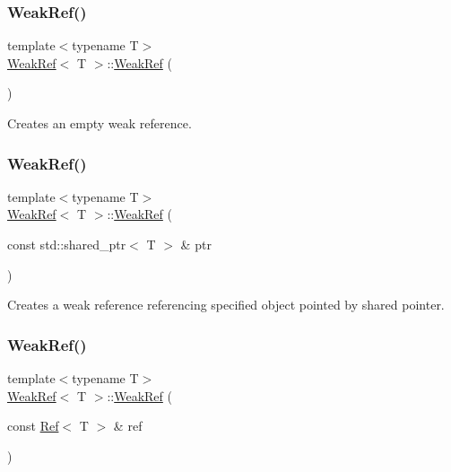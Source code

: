 \subsubsection{\texorpdfstring{WeakRef()}{WeakRef()}\hspace{0.1cm}{\footnotesize\ttfamily [1/4]}}
{\footnotesize\ttfamily template$<$typename T$>$ \\
\mbox{\hyperlink{class_weak_ref}{Weak\+Ref}}$<$ T $>$\+::\mbox{\hyperlink{class_weak_ref}{Weak\+Ref}} (\begin{DoxyParamCaption}{ }\end{DoxyParamCaption})\hspace{0.3cm}{\ttfamily [inline]}}



Creates an empty weak reference. 

\mbox{\label{class_weak_ref_a65c8f8562c7d454e5fbc3e6d146d7a83}} 
\subsubsection{\texorpdfstring{WeakRef()}{WeakRef()}\hspace{0.1cm}{\footnotesize\ttfamily [2/4]}}
{\footnotesize\ttfamily template$<$typename T$>$ \\
\mbox{\hyperlink{class_weak_ref}{Weak\+Ref}}$<$ T $>$\+::\mbox{\hyperlink{class_weak_ref}{Weak\+Ref}} (\begin{DoxyParamCaption}\item[{const std\+::shared\+\_\+ptr$<$ T $>$ \&}]{ptr }\end{DoxyParamCaption})\hspace{0.3cm}{\ttfamily [inline]}}



Creates a weak reference referencing specified object pointed by shared pointer. 

\mbox{\label{class_weak_ref_ab62598b1291c2f856ebc1634a4495232}} 
\subsubsection{\texorpdfstring{WeakRef()}{WeakRef()}\hspace{0.1cm}{\footnotesize\ttfamily [3/4]}}
{\footnotesize\ttfamily template$<$typename T$>$ \\
\mbox{\hyperlink{class_weak_ref}{Weak\+Ref}}$<$ T $>$\+::\mbox{\hyperlink{class_weak_ref}{Weak\+Ref}} (\begin{DoxyParamCaption}\item[{const \mbox{\hyperlink{class_ref}{Ref}}$<$ T $>$ \&}]{ref }\end{DoxyParamCaption})\hspace{0.3cm}{\ttfamily [inline]}}



